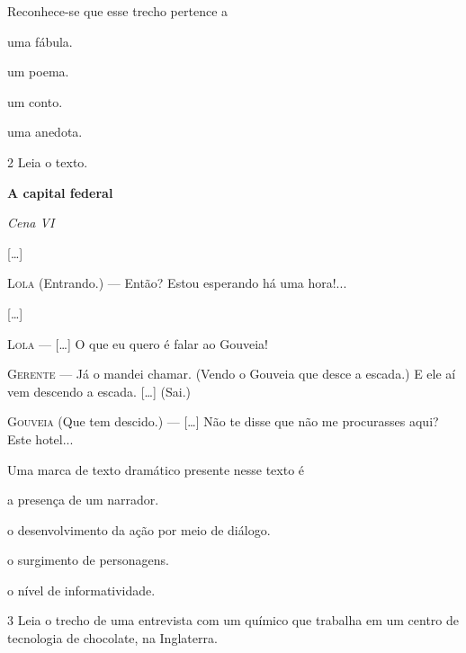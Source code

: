 Reconhece-se que esse trecho pertence a

\begin{multicols}{2}
\begin{escolha}
\item uma fábula.

\item um poema.

\item um conto.

\item uma anedota.
\end{escolha}
\end{multicols}

\pagebreak
\num{2} Leia o texto.

\begin{myquote}
\textbf{A capital federal}

\textit{Cena VI}

{[}\ldots{}{]}

\textsc{Lola} (Entrando.) --- Então? Estou esperando há uma hora!...

{[}\ldots{}{]}

\textsc{Lola} --- {[}\ldots{}{]} O que eu quero é falar ao Gouveia!

\textsc{Gerente} --- Já o mandei chamar. (Vendo o Gouveia que desce a escada.)
E ele aí vem descendo a escada. {[}\ldots{}{]} (Sai.)

\textsc{Gouveia} (Que tem descido.) --- {[}\ldots{}{]} Não te disse que não me
procurasses aqui? Este hotel...

\end{myquote}

Uma marca de texto dramático presente nesse texto é

\begin{escolha}
\item a presença de um narrador.

\item o desenvolvimento da ação por meio de diálogo.

\item o surgimento de personagens.

\item o nível de informatividade.
\end{escolha}

\num{3} Leia o trecho de uma entrevista com um químico que
trabalha em um centro de tecnologia de chocolate, na Inglaterra.

